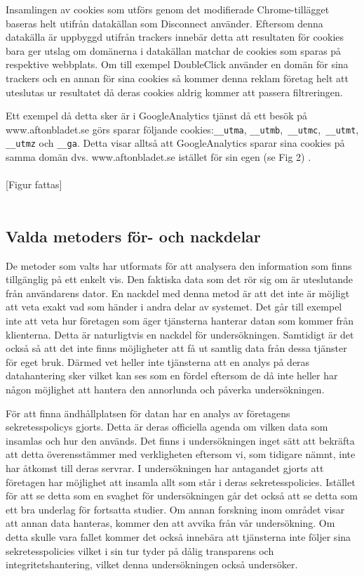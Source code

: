 \documentclass[a4paper,11pt]{article}
\begin{document}
{Insamlingen av cookies som utförs genom det modifierade Chrome-tillägget baseras helt utifrån datakällan som Disconnect använder. Eftersom denna datakälla är uppbyggd utifrån trackers innebär detta att resultaten för cookies bara ger utslag om domänerna i datakällan matchar de cookies som sparas på respektive webbplats. Om till exempel DoubleClick använder en domän för sina trackers och en annan för sina cookies så kommer denna reklam företag helt att uteslutas ur resultatet då deras cookies aldrig kommer att passera filtreringen.  

Ett exempel då detta sker är i GoogleAnalytics tjänst då ett besök på www.aftonbladet.se görs sparar följande cookies:\verb|__utma|, \verb|__utmb|,\verb| __utmc|,\verb| __utmt|,\verb| __utmz| och \verb|__ga|. Detta visar alltså att GoogleAnalytics sparar sina cookies på samma domän dvs. www.aftonbladet.se istället för sin egen (se Fig 2) \cite{GoogleAnalytics}.  \\\\

[Figur fattas] \\\\

\subsection{Valda metoders för- och nackdelar}
De metoder som valts har utformats för att analysera den information som finns tillgänglig på ett enkelt vis. Den faktiska data som det rör sig om är uteslutande från användarens dator. En nackdel med denna metod är att det inte är möjligt att veta exakt vad som händer i andra delar av systemet. Det går till exempel inte att veta hur företagen som äger tjänsterna hanterar datan som kommer från klienterna. Detta är naturligtvis en nackdel för undersökningen. Samtidigt är det också så att det inte finns möjligheter att få ut samtlig data från dessa tjänster för eget bruk. Därmed vet heller inte tjänsterna att en analys på deras datahantering sker vilket kan ses som en fördel eftersom de då inte heller har någon möjlighet att hantera den annorlunda och påverka undersökningen. 

För att finna ändhållplatsen för datan har en analys av företagens sekretesspolicys gjorts. Detta är deras officiella agenda om vilken data som insamlas och hur den används. Det finns i undersökningen inget sätt att bekräfta att detta överensstämmer med verkligheten eftersom vi, som tidigare nämnt, inte har åtkomst till deras servrar. I undersökningen har antagandet gjorts att företagen har möjlighet att insamla allt som står i deras sekretesspolicies. Istället för att se detta som en svaghet för undersökningen går det också att se detta som ett bra underlag för fortsatta studier. Om annan forskning inom området visar att annan data hanteras, kommer den att avvika från vår undersökning. Om detta skulle vara fallet kommer det också innebära att tjänsterna inte följer sina sekretesspolicies vilket i sin tur tyder på dålig transparens och integritetshantering, vilket denna undersökningen också undersöker. 

}
\end{document}
